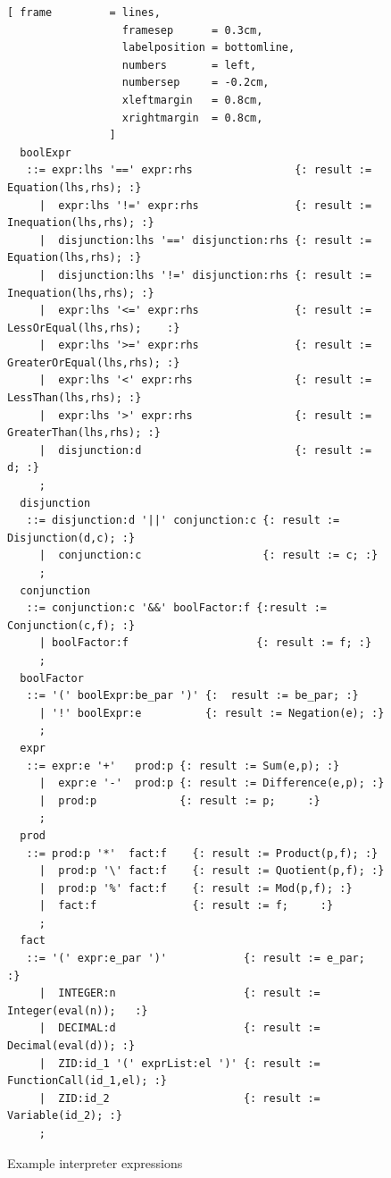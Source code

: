 \begin{figure}[!ht]

\begin{Verbatim}[ frame         = lines, 
                  framesep      = 0.3cm, 
                  labelposition = bottomline,
                  numbers       = left,
                  numbersep     = -0.2cm,
                  xleftmargin   = 0.8cm,
                  xrightmargin  = 0.8cm,
                ]
  boolExpr 
   ::= expr:lhs '==' expr:rhs                {: result := Equation(lhs,rhs); :}
     |  expr:lhs '!=' expr:rhs               {: result := Inequation(lhs,rhs); :}
     |  disjunction:lhs '==' disjunction:rhs {: result := Equation(lhs,rhs); :}
     |  disjunction:lhs '!=' disjunction:rhs {: result := Inequation(lhs,rhs); :}
     |  expr:lhs '<=' expr:rhs               {: result := LessOrEqual(lhs,rhs);    :}
     |  expr:lhs '>=' expr:rhs               {: result := GreaterOrEqual(lhs,rhs); :}
     |  expr:lhs '<' expr:rhs                {: result := LessThan(lhs,rhs); :}
     |  expr:lhs '>' expr:rhs                {: result := GreaterThan(lhs,rhs); :}
     |  disjunction:d                        {: result := d; :}
     ;
  disjunction
   ::= disjunction:d '||' conjunction:c {: result := Disjunction(d,c); :}
     |  conjunction:c                   {: result := c; :}
     ;
  conjunction
   ::= conjunction:c '&&' boolFactor:f {:result := Conjunction(c,f); :}
     | boolFactor:f                    {: result := f; :}
     ;
  boolFactor
   ::= '(' boolExpr:be_par ')' {:  result := be_par; :}
     | '!' boolExpr:e          {: result := Negation(e); :}
     ;
  expr 
   ::= expr:e '+'   prod:p {: result := Sum(e,p); :} 
     |  expr:e '-'  prod:p {: result := Difference(e,p); :} 
     |  prod:p             {: result := p;     :}
     ;
  prod 
   ::= prod:p '*'  fact:f    {: result := Product(p,f); :}
     |  prod:p '\' fact:f    {: result := Quotient(p,f); :} 
     |  prod:p '%' fact:f    {: result := Mod(p,f); :} 
     |  fact:f               {: result := f;     :}
     ;
  fact 
   ::= '(' expr:e_par ')'            {: result := e_par;   :} 
     |  INTEGER:n                    {: result := Integer(eval(n));   :} 
     |  DECIMAL:d                    {: result := Decimal(eval(d)); :}
     |  ZID:id_1 '(' exprList:el ')' {: result := FunctionCall(id_1,el); :}
     |  ZID:id_2                     {: result := Variable(id_2); :}
     ;
		\end{Verbatim}
\caption{Example interpreter expressions}
\label{fig:example_interpreter_grammar_expression}
\end{figure}
